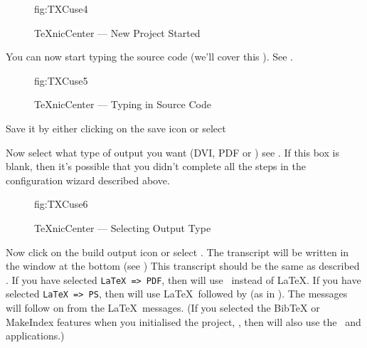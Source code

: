 \begin{figure}[hbtp]
  {\caption{TeXnicCenter --- New Project Started}}
  {fig:TXCuse4}
\end{figure}

You can now start typing the source code (we'll cover this
).  See .

\begin{figure}[hbtp]
  {\caption{TeXnicCenter --- Typing in Source Code}}
  {fig:TXCuse5}
\end{figure}

Save it by either clicking on the save icon 
 or 
select 

Now select what type of output you want (DVI, PDF or
\label{obj:txcdvips}) see
.  If this box is blank, then it's possible
that you didn't complete all the steps in the configuration wizard
described above.

\begin{figure}[hbtp]
  {\caption{TeXnicCenter --- Selecting Output Type}}
  {fig:TXCuse6}
\end{figure}

\label{TXC:latex}
Now click on the build output icon 
 or 
select .  The transcript will be
written in the window at the bottom (see )
This transcript should be the same as described .  If you have selected
\verb|LaTeX => PDF|, then  will use \iPDFLaTeX\
instead of \LaTeX.  If you have selected \verb|LaTeX => PS|, then
\appname{TeXnicCenter} will use \LaTeX\ followed by 
(as in \xfigureref{fig:TXCuse7}).  The \appname{dvips} messages will
follow on from the \LaTeX\ messages.  (If you selected the BibTeX or
MakeIndex features when you initialised the project,
, then  will also use
the \iBiBTeX\ and \appname{MakeIndex} applications.)

